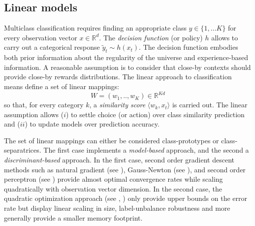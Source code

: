 \documentclass[preprint,12pt,authoryear]{elsarticle}
\begin{document}
\subsection{Linear models}
Multiclass classification requires  finding an appropriate class $y \in \{1,... K\}$ for every observation vector $x \in \mathbb{R}^d$.
The \textit{decision function} (or policy) $h$
allows to carry out a categorical response $\tilde{y}_t \sim h(x_t)$. The decision function embodies both prior information about the regularity of the universe and experience-based information. A reasonable assumption  is to consider that  close-by contexts should provide close-by rewards distributions. 
The linear approach to classification means 
define a set of linear mappings:
\begin{equation}\label{eq:W}
W = (w_1,..,w_K) \in \mathbb{R}^{K d}
\end{equation} so that, for every category $k$, a \emph{similarity score} $\langle w_k, x_t\rangle$ is carried out. 
The linear assumption allows ($i$) to 
settle choice (or action) over class similarity prediction and ($ii$) to update models over prediction accuracy.

The set of linear mappings can either be considered class-prototypes or class-separatrices. The first case implements a \textit{model-based} approach, and the second a \textit{discriminant-based} approach. In the first case,  second order gradient descent methods such as natural gradient (see \cite{amari2000adaptive}), Gauss-Newton (see \cite{le2004large}), and second order perceptron (see \cite{cesa2005second}) provide almost optimal convergence rates while scaling quadratically with observation vector dimension.
In the second case, the quadratic optimization approach (see \cite{anlauf1989adatron}, \cite{crammer2006online}) only provide upper bounds on the error rate but display linear scaling in size, label-unbalance robustness and more generally provide a smaller memory footprint. 
\end{document}
